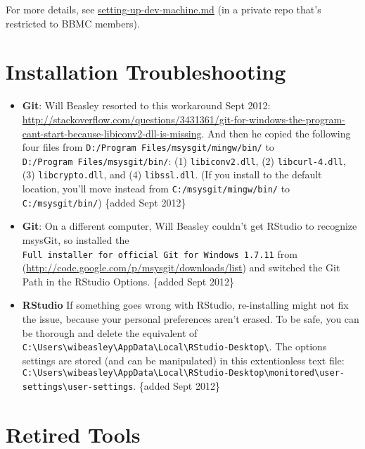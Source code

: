 \documentclass[
]{book}
\begin{document}
For more details, see \href{https://github.com/OuhscBbmc/bbmc-database-management/blob/master/maintenance/setting-up-server/setting-up-dev-machine.md}{setting-up-dev-machine.md} (in a private repo that's restricted to BBMC members).

\hypertarget{workstation-troubleshooting}{%
\section{Installation Troubleshooting}\label{workstation-troubleshooting}}

\begin{itemize}
\item
  \textbf{Git}: Will Beasley resorted to this workaround Sept 2012: \url{http://stackoverflow.com/questions/3431361/git-for-windows-the-program-cant-start-because-libiconv2-dll-is-missing}. And then he copied the following four files from \texttt{D:/Program\ Files/msysgit/mingw/bin/} to \texttt{D:/Program\ Files/msysgit/bin/}: (1) \texttt{libiconv2.dll}, (2) \texttt{libcurl-4.dll}, (3) \texttt{libcrypto.dll}, and (4) \texttt{libssl.dll}. (If you install to the default location, you'll move instead from \texttt{C:/msysgit/mingw/bin/} to \texttt{C:/msysgit/bin/}) \{added Sept 2012\}
\item
  \textbf{Git}: On a different computer, Will Beasley couldn't get RStudio to recognize msysGit, so installed the \texttt{Full\ installer\ for\ official\ Git\ for\ Windows\ 1.7.11} from (\url{http://code.google.com/p/msysgit/downloads/list}) and switched the Git Path in the RStudio Options. \{added Sept 2012\}
\item
  \textbf{RStudio} If something goes wrong with RStudio, re-installing might not fix the issue, because your personal preferences aren't erased. To be safe, you can be thorough and delete the equivalent of \texttt{C:\textbackslash{}Users\textbackslash{}wibeasley\textbackslash{}AppData\textbackslash{}Local\textbackslash{}RStudio-Desktop\textbackslash{}}. The options settings are stored (and can be manipulated) in this extentionless text file: \texttt{C:\textbackslash{}Users\textbackslash{}wibeasley\textbackslash{}AppData\textbackslash{}Local\textbackslash{}RStudio-Desktop\textbackslash{}monitored\textbackslash{}user-settings\textbackslash{}user-settings}. \{added Sept 2012\}
\end{itemize}

\hypertarget{workstation-retired}{%
\section{Retired Tools}\label{workstation-retired}}
\end{document}
